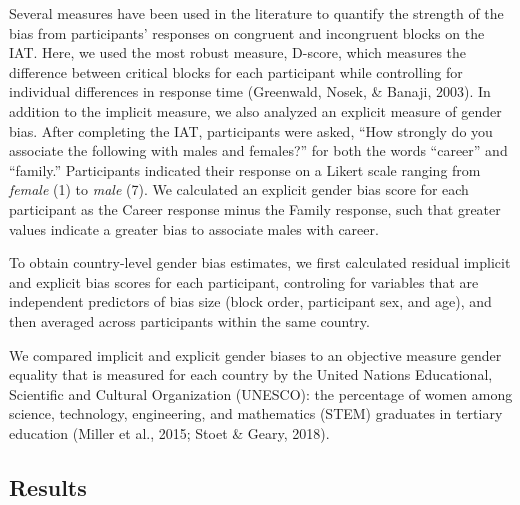 \documentclass[man]{apa6}
\theoremstyle{definition}
\theoremstyle{definition}
\theoremstyle{definition}
\theoremstyle{remark}
\begin{document}
Several measures have been used in the literature to quantify the
strength of the bias from participants' responses on congruent and
incongruent blocks on the IAT. Here, we used the most robust measure,
D-score, which measures the difference between critical blocks for each
participant while controlling for individual differences in response
time (Greenwald, Nosek, \& Banaji, 2003). In addition to the implicit
measure, we also analyzed an explicit measure of gender bias. After
completing the IAT, participants were asked, \enquote{How strongly do
you associate the following with males and females?} for both the words
\enquote{career} and \enquote{family.} Participants indicated their
response on a Likert scale ranging from \emph{female} (1) to \emph{male}
(7). We calculated an explicit gender bias score for each participant as
the Career response minus the Family response, such that greater values
indicate a greater bias to associate males with career.

To obtain country-level gender bias estimates, we first calculated
residual implicit and explicit bias scores for each participant,
controling for variables that are independent predictors of bias size
(block order, participant sex, and age), and then averaged across
participants within the same country.

We compared implicit and explicit gender biases to an objective measure
gender equality that is measured for each country by the United Nations
Educational, Scientific and Cultural Organization (UNESCO): the
percentage of women among science, technology, engineering, and
mathematics (STEM) graduates in tertiary education (Miller et al., 2015;
Stoet \& Geary, 2018).

\subsection{Results}\label{results}
\end{document}
